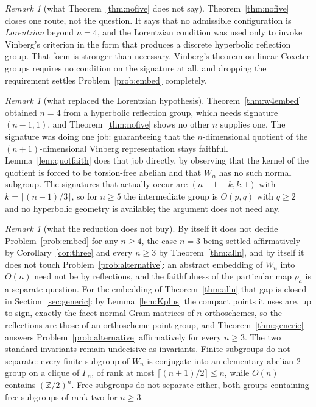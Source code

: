 \documentclass[11pt]{article}
\theoremstyle{definition}
\theoremstyle{remark}
\newtheorem{remark}[theorem]{Remark}
\theoremstyle{definition}
\newcommand{\Z}{\mathbb{Z}}
\begin{document}
\begin{remark}[what Theorem~\ref{thm:nofive} does not say]\label{rem:stopsatfour}
Theorem~\ref{thm:nofive} closes one route, not the question. It says that no admissible
configuration is \emph{Lorentzian} beyond $n=4$, and the Lorentzian condition was used only to
invoke Vinberg's criterion in the form that produces a discrete hyperbolic reflection group. That
form is stronger than necessary. Vinberg's theorem on linear Coxeter groups requires no condition
on the signature at all, and dropping the requirement settles Problem~\ref{prob:embed} completely.
\end{remark}

\begin{remark}[what replaced the Lorentzian hypothesis]\label{rem:whatchanged}
Theorem~\ref{thm:w4embed} obtained $n=4$ from a hyperbolic reflection group, which needs signature
$(n-1,1)$, and Theorem~\ref{thm:nofive} shows no other $n$ supplies one. The signature was doing
one job: guaranteeing that the $n$-dimensional quotient of the $(n+1)$-dimensional Vinberg
representation stays faithful. Lemma~\ref{lem:quotfaith} does that job directly, by observing that
the kernel of the quotient is forced to be torsion-free abelian and that $W_n$ has no such normal
subgroup. The signatures that actually occur are $(n-1-k,k,1)$ with $k=\lceil(n-1)/3\rceil$, so for
$n\ge5$ the intermediate group is $O(p,q)$ with $q\ge2$ and no hyperbolic geometry is available;
the argument does not need any.
\end{remark}

\begin{remark}[what the reduction does not buy]\label{rem:notbuys}
By itself it does not decide Problem~\ref{prob:embed} for any $n\ge4$, the case $n=3$ being settled
affirmatively by Corollary~\ref{cor:three} and every $n\ge3$ by Theorem~\ref{thm:alln}, and by
itself it does not touch Problem~\ref{prob:alternative}: an abstract embedding of $W_n$ into
$O(n)$ need not be by reflections, and the faithfulness of the particular map $\rho_a$ is a
separate question. For the embedding of Theorem~\ref{thm:alln} that gap is closed in
Section~\ref{sec:generic}: by Lemma~\ref{lem:Kplus} the compact points it uses are, up to sign,
exactly the facet-normal Gram matrices of $n$-orthoschemes, so the reflections are those of an
orthoscheme point group, and Theorem~\ref{thm:generic} answers Problem~\ref{prob:alternative}
affirmatively for every $n\ge3$. The two standard invariants remain undecisive as invariants. Finite subgroups do not separate: every finite subgroup of
$W_n$ is conjugate into an elementary abelian $2$-group on a clique of $\Gamma_n$, of rank at
most $\lceil(n+1)/2\rceil\le n$, while $O(n)$ contains $(\Z/2)^n$. Free subgroups do not
separate either, both groups containing free subgroups of rank two for $n\ge3$.
\end{remark}
\end{document}

